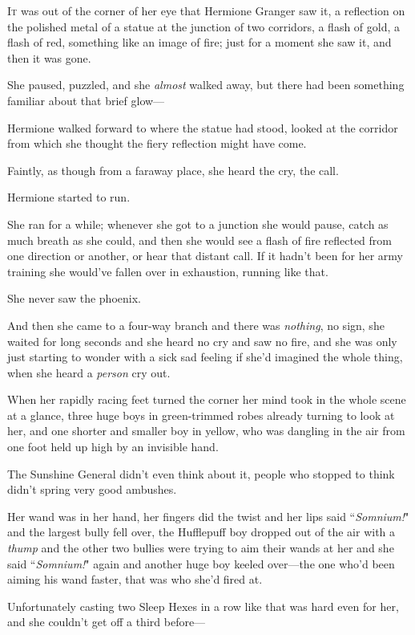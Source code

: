 
\lettrine{I}{t} was out of the corner of her eye that Hermione Granger saw it, a reflection on the polished metal of a statue at the junction of two corridors, a flash of gold, a flash of red, something like an image of fire; just for a moment she saw it, and then it was gone.

She paused, puzzled, and she \emph{almost} walked away, but there had been something familiar about that brief glow---

Hermione walked forward to where the statue had stood, looked at the corridor from which she thought the fiery reflection might have come.

Faintly, as though from a faraway place, she heard the cry, the call.

Hermione started to run.

She ran for a while; whenever she got to a junction she would pause, catch as much breath as she could, and then she would see a flash of fire reflected from one direction or another, or hear that distant call. If it hadn't been for her army training she would've fallen over in exhaustion, running like that.

She never saw the phoenix.

And then she came to a four-way branch and there was \emph{nothing}, no sign, she waited for long seconds and she heard no cry and saw no fire, and she was only just starting to wonder with a sick sad feeling if she'd imagined the whole thing, when she heard a \emph{person} cry out.

When her rapidly racing feet turned the corner her mind took in the whole scene at a glance, three huge boys in green-trimmed robes already turning to look at her, and one shorter and smaller boy in yellow, who was dangling in the air from one foot held up high by an invisible hand.

The Sunshine General didn't even think about it, people who stopped to think didn't spring very good ambushes.

Her wand was in her hand, her fingers did the twist and her lips said ``\emph{Somnium!}" and the largest bully fell over, the Hufflepuff boy dropped out of the air with a \emph{thump} and the other two bullies were trying to aim their wands at her and she said ``\emph{Somnium!}" again and another huge boy keeled over---the one who'd been aiming his wand faster, that was who she'd fired at.

Unfortunately casting two Sleep Hexes in a row like that was hard even for her, and she couldn't get off a third before---

